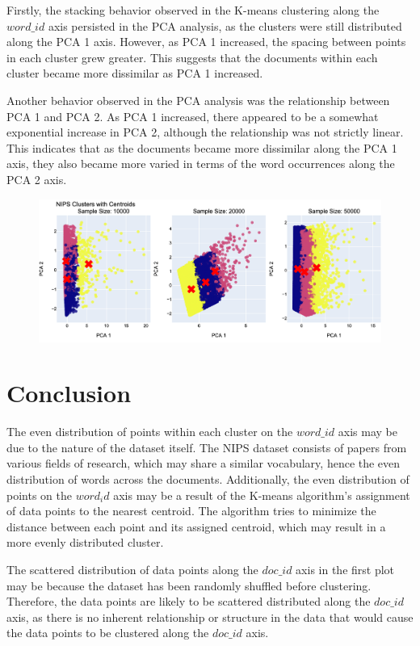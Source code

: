 \documentclass{article}
\begin{document}
Firstly, the stacking behavior observed in the K-means clustering along the $word\_id$ axis persisted in the PCA analysis, as the clusters were still distributed along the PCA 1 axis. However, as PCA 1 increased, the spacing between points in each cluster grew greater. This suggests that the documents within each cluster became more dissimilar as PCA 1 increased.

Another behavior observed in the PCA analysis was the relationship between PCA 1 and PCA 2. As PCA 1 increased, there appeared to be a somewhat exponential increase in PCA 2, although the relationship was not strictly linear. This indicates that as the documents became more dissimilar along the PCA 1 axis, they also became more varied in terms of the word occurrences along the PCA 2 axis.



\begin{figure}[h]
    \centering
    \includegraphics[width=1\textwidth]{figs/pca.png}
\end{figure}



\section{Conclusion}

The even distribution of points within each cluster on the $word\_id$ axis may be due to the nature of the dataset itself. The NIPS dataset consists of papers from various fields of research, which may share a similar vocabulary, hence the even distribution of words across the documents. Additionally, the even distribution of points on the $word_id$ axis may be a result of the K-means algorithm's assignment of data points to the nearest centroid. The algorithm tries to minimize the distance between each point and its assigned centroid, which may result in a more evenly distributed cluster.

The scattered distribution of data points along the $doc\_id$ axis in the first plot may be because the dataset has been randomly shuffled before clustering. Therefore, the data points are likely to be scattered distributed along the $doc\_id$ axis, as there is no inherent relationship or structure in the data that would cause the data points to be clustered along the $doc\_id$ axis.
\end{document}
